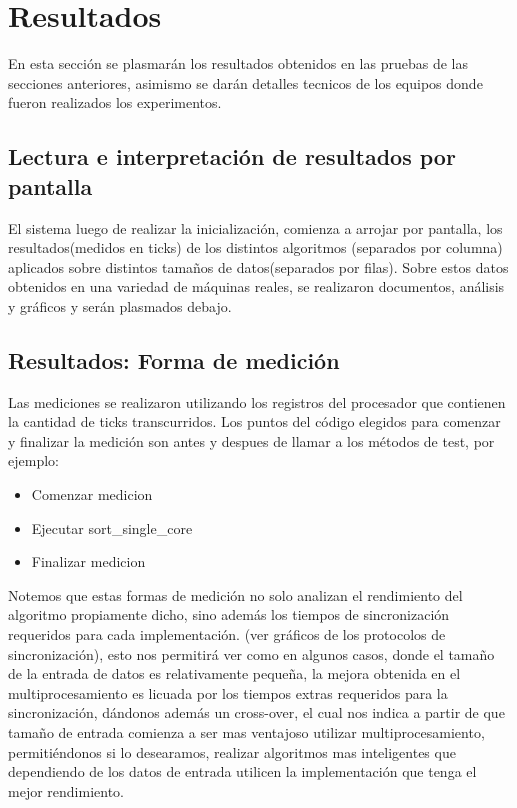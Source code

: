 \section{Resultados}
En esta sección se plasmarán los resultados obtenidos en las pruebas de las secciones anteriores, asimismo se darán detalles tecnicos de los equipos donde fueron realizados los experimentos.
\subsection{Lectura e interpretación de resultados por pantalla}
El sistema luego de realizar la inicialización, comienza a arrojar por pantalla, los resultados(medidos en ticks) de los distintos algoritmos (separados por columna) aplicados sobre distintos tamaños de datos(separados por filas). Sobre estos datos obtenidos en una variedad de máquinas reales, se realizaron documentos, análisis y gráficos y serán plasmados debajo.
\subsection{Resultados: Forma de medición}
Las mediciones se realizaron utilizando los registros del procesador que contienen la cantidad de ticks transcurridos. Los puntos del código elegidos para comenzar y finalizar la medición son antes y despues de llamar a los métodos de test, por ejemplo:
\begin{itemize}
	\item Comenzar medicion
	\item Ejecutar sort\_single\_core\(\)
	\item Finalizar medicion
\end{itemize}

Notemos que estas formas de medición no solo analizan el rendimiento del algoritmo propiamente dicho, sino además los tiempos de sincronización requeridos para cada implementación. (ver gráficos de los protocolos de sincronización), esto nos permitirá ver como en algunos casos, donde el tamaño de la entrada de datos es relativamente pequeña, la mejora obtenida en el multiprocesamiento es licuada por los tiempos extras requeridos para la sincronización, dándonos además un cross-over, el cual nos indica a partir de que tamaño de entrada comienza a ser mas ventajoso utilizar multiprocesamiento, permitiéndonos si lo desearamos, realizar algoritmos mas inteligentes que dependiendo de los datos de entrada utilicen la implementación que tenga el mejor rendimiento.


